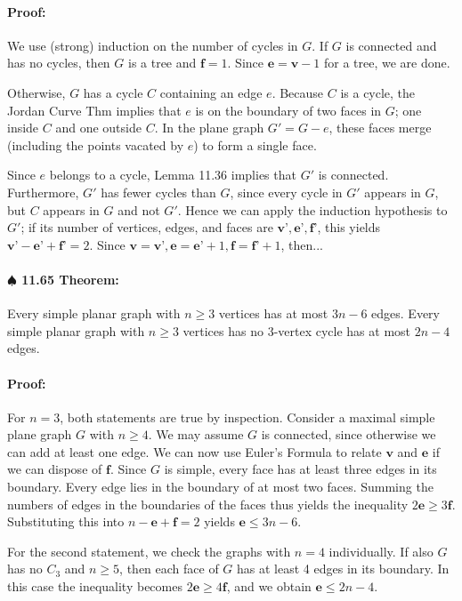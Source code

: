 \documentclass[a4paper, 11pt, twoside]{article}
\begin{document}
\paragraph{Proof:} We use (strong) induction on the number of cycles in $G$. If $G$ is connected and has no cycles, then $G$ is a tree and $\textbf{f}=1$. Since $\textbf{e}=\textbf{v}-1$ for a tree, we are done.

Otherwise, $G$ has a cycle $C$ containing an edge $e$. Because $C$ is a cycle, the Jordan Curve Thm implies that $e$ is on the boundary of two faces in $G$; one inside $C$ and one outside $C$. In the plane graph $G'=G-e$, these faces merge (including the points vacated by $e$) to form a single face.

Since $e$ belongs to a cycle, Lemma 11.36 implies that $G'$ is connected. Furthermore, $G'$ has fewer cycles than $G$, since every cycle in $G'$ appears in $G$, but $C$ appears in $G$ and not $G'$. Hence we can apply the induction hypothesis to $G'$; if its number of vertices, edges, and faces are $\textbf{v'}, \textbf{e'}, \textbf{f'}$, this yields $\textbf{v'}-\textbf{e'}+\textbf{f'}=2$. Since $\textbf{v}=\textbf{v'}, \textbf{e}=\textbf{e'}+1,\textbf{f}=\textbf{f'}+1$, then...

\paragraph{$\spadesuit$ 11.65 Theorem:} Every simple planar graph with $n\geq 3$ vertices has at most $3n-6$ edges. Every simple planar graph with $n\geq 3$ vertices has no $3$-vertex cycle has at most $2n-4$ edges.

\paragraph{Proof:} For $n=3$, both statements are true by inspection. Consider a maximal simple plane graph $G$ with $n\geq 4$. We may assume $G$ is connected, since otherwise we can add at least one edge. We can now use Euler's Formula to relate $\textbf{v}$ and $\textbf{e}$ if we can dispose of $\textbf{f}$. Since $G$ is simple, every face has at least three edges in its boundary. Every edge lies in the boundary of at most two faces. Summing the numbers of edges in the boundaries of the faces thus yields the inequality $2\textbf{e}\geq 3\textbf{f}$. Substituting this into $n-\textbf{e}+\textbf{f}=2$ yields $\textbf{e}\leq 3n-6$.

For the second statement, we check the graphs with $n=4$ individually. If also $G$ has no $C_3$ and $n\geq 5$, then each face of $G$ has at least 4 edges in its boundary. In this case the inequality becomes $2\textbf{e}\geq 4\textbf{f}$, and we obtain $\textbf{e}\leq 2n- 4$.
\end{document}
